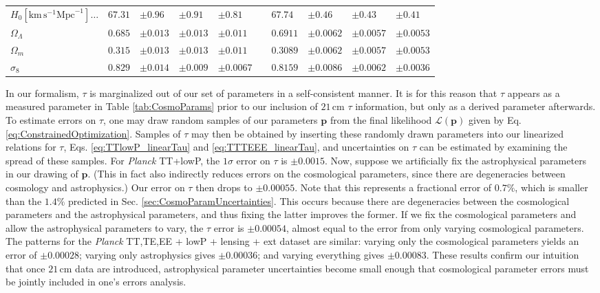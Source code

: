\documentclass[twocolumn,aps,prd,nofootinbib,showpacs]{revtex4-1}
\begin{document}
\begin{table}
\begin{ruledtabular}
\begin{tabular}{lllllcllll}
$H_0 \left[ \textrm{km}\,\textrm{s}^{-1}\textrm{Mpc}^{-1}\right] \dots$ \dotfill & $67.31 $&$\pm 0.96$ & $\pm0.91$ &  $\pm 0.81$ && $67.74 $&$\pm 0.46$ & $\pm 0.43$ &  $\pm 0.41$ \\
$\Omega_\Lambda$ \dotfill & $0.685 $&$\pm 0.013$ &  $ \pm 0.013$ &  $\pm 0.011$ && $0.6911$& $ \pm 0.0062$ & $\pm 0.0057$ &  $\pm 0.0053$ \\
$\Omega_m$ \dotfill & $0.315$& $ \pm 0.013$ &   $ \pm 0.013$ & $\pm 0.011$&& $0.3089 $&$\pm 0.0062$ & $\pm 0.0057$ &  $\pm 0.0053$  \\
$\sigma_8$ \dotfill & $0.829$&$ \pm 0.014$ & $\pm 0.009$ & $\mathbf{\pm 0.0067}$ && $0.8159$& $ \pm 0.0086$ & $\pm 0.0062$ &  $\mathbf{\pm 0.0036}$\\
\end{tabular}
\end{ruledtabular}
\end{table}

In our formalism, $\tau$ is marginalized out of our set of parameters in a self-consistent manner. It is for this reason that $\tau$ appears as a measured parameter in Table \ref{tab:CosmoParams} prior to our inclusion of $21\,\textrm{cm}$ $\tau$ information, but only as a derived parameter afterwards. To estimate errors on $\tau$, one may draw random samples of our parameters $\mathbf{p}$ from the final likelihood $\mathcal L (\mathbf{p})$ given by Eq. \eqref{eq:ConstrainedOptimization}. Samples of $\tau$ may then be obtained by inserting these randomly drawn parameters into our linearized relations for $\tau$, Eqs. \eqref{eq:TTlowP_linearTau} and \eqref{eq:TTTEEE_linearTau}, and uncertainties on $\tau$ can be estimated by examining the spread of these samples. For \emph{Planck} TT+lowP, the $1\sigma$ error on $\tau$ is $\pm 0.0015$. Now, suppose we artificially fix the astrophysical parameters in our drawing of $\mathbf{p}$. (This in fact also indirectly reduces errors on the cosmological parameters, since there are degeneracies between cosmology and astrophysics.) Our error on $\tau$ then drops to $\pm 0.00055$. Note that this represents a fractional error of $0.7\%$, which is smaller than the $1.4\%$ predicted in Sec. \ref{sec:CosmoParamUncertainties}. This occurs because there are degeneracies between the cosmological parameters and the astrophysical parameters, and thus fixing the latter improves the former. If we fix the cosmological parameters and allow the astrophysical parameters to vary, the $\tau$ error is $\pm 0.00054$, almost equal to the error from only varying cosmological parameters. The patterns for the \emph{Planck} TT,TE,EE + lowP + lensing + ext dataset are similar: varying only the cosmological parameters yields an error of $\pm 0.00028$; varying only astrophysics gives $\pm 0.00036$; and varying everything gives $\pm 0.00083$. These results confirm our intuition that once $21\,\textrm{cm}$ data are introduced, astrophysical parameter uncertainties become small enough that cosmological parameter errors must be jointly included in one's errors analysis.
\end{document}
